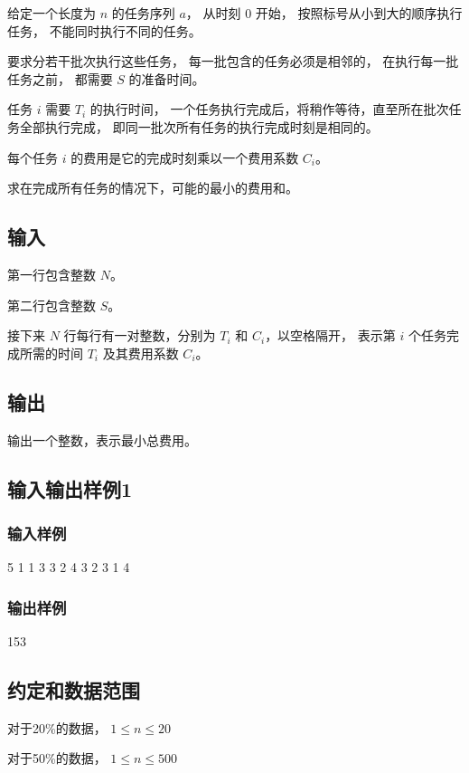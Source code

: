 \documentclass[UTF8]{ctexart}
\begin{document}
给定一个长度为 $n$ 的任务序列 $a$， 从时刻 $0$ 开始， 按照标号从小到大的顺序执行任务， 不能同时执行不同的任务。

要求分若干批次执行这些任务， 每一批包含的任务必须是相邻的， 在执行每一批任务之前， 都需要 $S$ 的准备时间。

任务 $i$ 需要 $T_i$ 的执行时间， 一个任务执行完成后，将稍作等待，直至所在批次任务全部执行完成， 即同一批次所有任务的执行完成时刻是相同的。

每个任务 $i$ 的费用是它的完成时刻乘以一个费用系数 $C_i$。

求在完成所有任务的情况下，可能的最小的费用和。

\subsection{输入} 

第一行包含整数 $N$。

第二行包含整数 $S$。

接下来 $N$ 行每行有一对整数，分别为 $T_i$ 和 $C_i$，以空格隔开， 表示第 $i$ 个任务完成所需的时间 $T_i$ 及其费用系数 $C_i$。

\subsection{输出}

输出一个整数，表示最小总费用。

\subsection{输入输出样例1}

\subsubsection{输入样例}

5
1
1 3
3 2
4 3
2 3
1 4

\subsubsection{输出样例}

153


\subsection{约定和数据范围}

对于20\%的数据， $1\le n\le 20$

对于50\%的数据， $1\le n\le 500$
\end{document}

